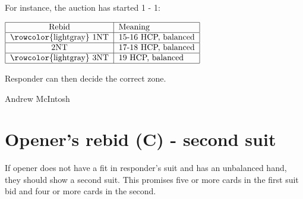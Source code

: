 \documentclass[14pt]{extarticle}
\begin{document}
\noindent For instance, the auction has started 1\textcolor{ForestGreen}{} - 1\textcolor{red}{}:
\\
\begin{center}
$\begin{tabular}{|c|l|}
\hline
Rebid & Meaning\\
\hline
\rowcolor{lightgray}
1NT & 15-16 HCP, balanced\\
\hline
2NT &17-18 HCP, balanced\\
\hline
\rowcolor{lightgray}
3NT & 19 HCP, balanced\\
\hline
\end{tabular}$\\\end{center}
\vspace{0.15in}
\noindent Responder can then decide the correct zone.
\vspace*{\fill}
\begin{flushbottom}
 \begin{center}
 \tiny
 \textcopyright Andrew McIntosh
\end{center}
\end{flushbottom}




\vspace*{\fill}
\begingroup
\centering

\section*{Opener's rebid (C) - second suit}
\endgroup
\noindent If opener does not have a fit in responder's suit and has an unbalanced hand, they should show a second suit. This promises five or more cards in the first suit bid and four or more cards in the second. \\
% 
\end{document}
